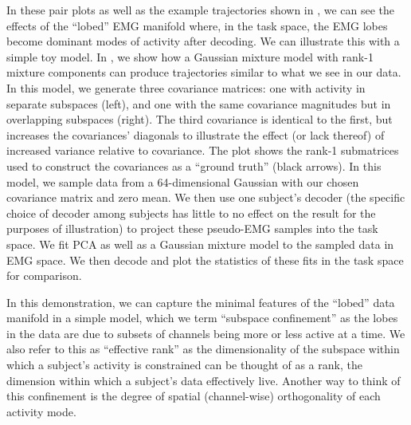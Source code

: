 \documentclass[../main.tex]{subfiles}
\begin{document}
In these pair plots as well as the example trajectories shown in , we can see the effects of the ``lobed'' EMG manifold where, in the task space, the EMG lobes become dominant modes of activity after decoding. We can illustrate this with a simple toy model. In , we show how a Gaussian mixture model with rank-1 mixture components can produce trajectories similar to what we see in our data. In this model, we generate three covariance matrices: one with activity in separate subspaces (left), and one with the same covariance magnitudes but in overlapping subspaces (right). The third covariance is identical to the first, but increases the covariances' diagonals to illustrate the effect (or lack thereof) of increased variance relative to covariance. The plot shows the rank-1 submatrices used to construct the covariances as a ``ground truth'' (black arrows). In this model, we sample data from a 64-dimensional Gaussian with our chosen covariance matrix and zero mean. We then use one subject's decoder (the specific choice of decoder among subjects has little to no effect on the result for the purposes of illustration) to project these pseudo-EMG samples into the task space. We fit PCA as well as a Gaussian mixture model to the sampled data in EMG space. We then decode and plot the statistics of these fits in the task space for comparison.

In this demonstration, we can capture the minimal features of the ``lobed'' data manifold in a simple model, which we term ``subspace confinement'' as the lobes in the data are due to subsets of channels being more or less active at a time. We also refer to this as ``effective rank'' as the dimensionality of the subspace within which a subject's activity is constrained can be thought of as a rank, the dimension within which a subject's data effectively live. Another way to think of this confinement is the degree of spatial (channel-wise) orthogonality of each activity mode.
\end{document}
